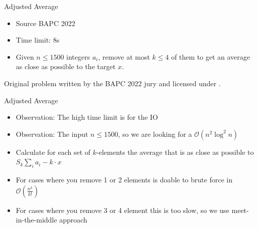 \documentclass[11pt,pdf, aspectratio=169]{beamer}
\begin{document}
  \begin{frame}{Adjusted Average}
    \begin{itemize}
      \item Source BAPC 2022
      \item Time limit: 8s
      \item Given $n \leq 1500$ integers $a_i$, remove at most $k \leq 4$ of them to get an average as close as possible to the target $x$.
    \end{itemize}
    Original problem written by the BAPC 2022 jury and licensed under \doclicenseLongNameRef.

    \doclicenseImage
  \end{frame}
  \begin{frame}{Adjusted Average}
    \begin{itemize}
      \item Observation: The high time limit is for the IO
      \item Observation: The input $n \leq 1500$, so we are looking for a $\mathcal{O}(n^2\log^2 n)$
      \item Calculate for each set of $k$-elements the average that is as close as possible to $S_k \sum_{i} a_i - k\cdot x $
      \item For cases where you remove 1 or 2 elements is doable to brute force in $\mathcal{O}\left(\frac{n^k}{k!}\right)$
      \item For cases where you remove 3 or 4 element this is too slow, so we use meet-in-the-middle approach
    \end{itemize}
  \end{frame}
\end{document}
